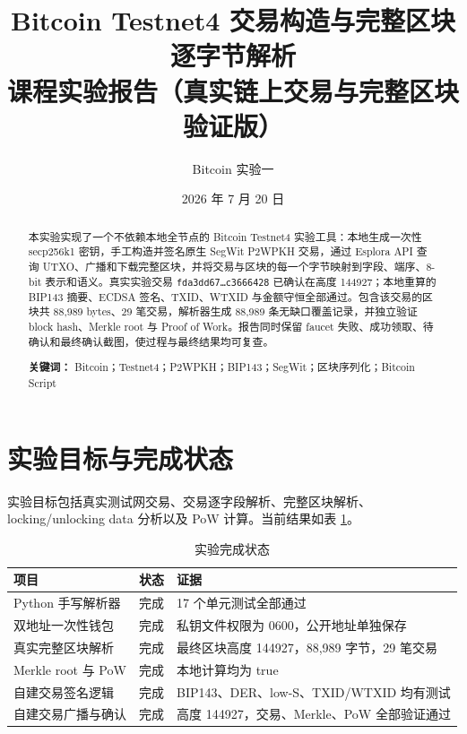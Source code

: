 \documentclass[11pt,a4paper,fontset=none]{ctexart}
\title{\bfseries Bitcoin Testnet4 交易构造与完整区块逐字节解析\\[0.5em]
\large 课程实验报告（真实链上交易与完整区块验证版）}
\author{Bitcoin 实验一}
\date{2026 年 7 月 20 日}
\begin{document}
\maketitle

\begin{abstract}
本实验实现了一个不依赖本地全节点的 Bitcoin Testnet4 实验工具：本地生成一次性 secp256k1 密钥，手工构造并签名原生 SegWit P2WPKH 交易，通过 Esplora API 查询 UTXO、广播和下载完整区块，并将交易与区块的每一个字节映射到字段、端序、8-bit 表示和语义。真实实验交易 \texttt{fda3dd67\ldots c3666428} 已确认在高度 144927；本地重算的 BIP143 摘要、ECDSA 签名、TXID、WTXID 与金额守恒全部通过。包含该交易的区块共 88,989 bytes、29 笔交易，解析器生成 88,989 条无缺口覆盖记录，并独立验证 block hash、Merkle root 与 Proof of Work。报告同时保留 faucet 失败、成功领取、待确认和最终确认截图，使过程与最终结果均可复查。

\textbf{关键词：} Bitcoin；Testnet4；P2WPKH；BIP143；SegWit；区块序列化；Bitcoin Script
\end{abstract}

\clearpage
\begingroup
\footnotesize
\setlength{\parskip}{0pt}
\linespread{0.90}\selectfont
\tableofcontents
\endgroup
\newpage

\section{实验目标与完成状态}

实验目标包括真实测试网交易、交易逐字段解析、完整区块解析、locking/unlocking data 分析以及 PoW 计算。当前结果如表 \ref{tab:status}。

\begin{table}[htbp]
\centering
\caption{实验完成状态}
\label{tab:status}
\begin{tabular}{p{}p{}p{}}
\toprule
项目 & 状态 & 证据 \\
\midrule
Python 手写解析器 & 完成 & 17 个单元测试全部通过 \\
双地址一次性钱包 & 完成 & 私钥文件权限为 0600，公开地址单独保存 \\
真实完整区块解析 & 完成 & 最终区块高度 144927，88,989 字节，29 笔交易 \\
Merkle root 与 PoW & 完成 & 本地计算均为 true \\
自建交易签名逻辑 & 完成 & BIP143、DER、low-S、TXID/WTXID 均有测试 \\
自建交易广播与确认 & 完成 & 高度 144927，交易、Merkle、PoW 全部验证通过 \\
\bottomrule
\end{tabular}
\end{table}
\end{document}

